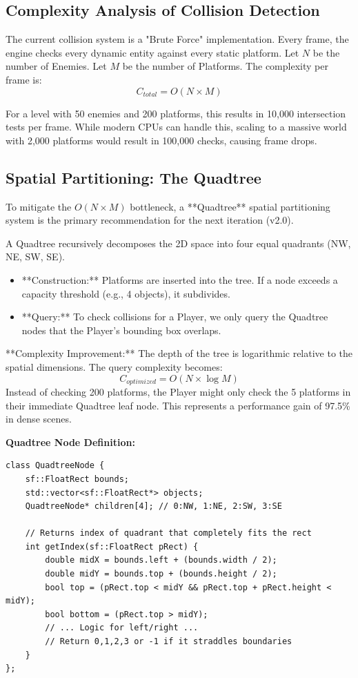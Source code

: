 \documentclass[10pt, a4paper]{article}
\begin{document}
\subsection{Complexity Analysis of Collision Detection}
The current collision system is a "Brute Force" implementation. Every frame, the engine checks every dynamic entity against every static platform.
Let $N$ be the number of Enemies.
Let $M$ be the number of Platforms.
The complexity per frame is:
\begin{equation}
C_{total} = O(N \times M)
\end{equation}

For a level with 50 enemies and 200 platforms, this results in 10,000 intersection tests per frame. While modern CPUs can handle this, scaling to a massive world with 2,000 platforms would result in 100,000 checks, causing frame drops.

\subsection{Spatial Partitioning: The Quadtree}
To mitigate the $O(N \times M)$ bottleneck, a **Quadtree** spatial partitioning system is the primary recommendation for the next iteration (v2.0).

A Quadtree recursively decomposes the 2D space into four equal quadrants (NW, NE, SW, SE). 
\begin{itemize}
    \item **Construction:** Platforms are inserted into the tree. If a node exceeds a capacity threshold (e.g., 4 objects), it subdivides.
    \item **Query:** To check collisions for a Player, we only query the Quadtree nodes that the Player's bounding box overlaps.
\end{itemize}

**Complexity Improvement:**
The depth of the tree is logarithmic relative to the spatial dimensions. The query complexity becomes:
\begin{equation}
C_{optimized} = O(N \times \log M)
\end{equation}
Instead of checking 200 platforms, the Player might only check the 5 platforms in their immediate Quadtree leaf node. This represents a performance gain of 97.5\% in dense scenes.

\textbf{Quadtree Node Definition:}
\begin{lstlisting}[style=cppstyle, caption={Proposed Quadtree Node Structure}]
class QuadtreeNode {
    sf::FloatRect bounds;
    std::vector<sf::FloatRect*> objects;
    QuadtreeNode* children[4]; // 0:NW, 1:NE, 2:SW, 3:SE
    
    // Returns index of quadrant that completely fits the rect
    int getIndex(sf::FloatRect pRect) {
        double midX = bounds.left + (bounds.width / 2);
        double midY = bounds.top + (bounds.height / 2);
        bool top = (pRect.top < midY && pRect.top + pRect.height < midY);
        bool bottom = (pRect.top > midY);
        // ... Logic for left/right ...
        // Return 0,1,2,3 or -1 if it straddles boundaries
    }
};
\end{lstlisting}
\end{document}
